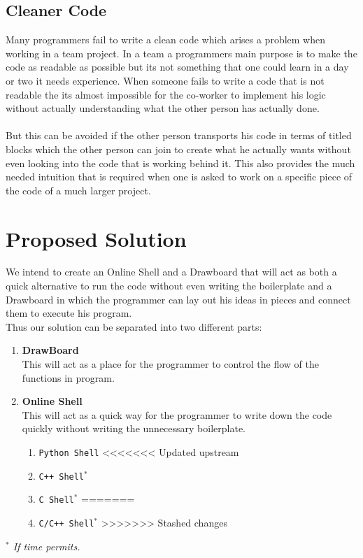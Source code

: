 \documentclass[letterpaper,10pt]{article}
\begin{document}
  		\subsection{Cleaner Code}
  		Many programmers fail to write a clean code which arises a problem when working in a team project. In a team a programmers main purpose is to make the code as readable as possible but its not something that one could learn in a day or two it needs experience. When someone fails to write a code that is not readable the its almost impossible for the co-worker to implement his logic without actually understanding what the other person has actually done.\\\\ But this can be avoided if the other person transports his code in terms of titled blocks which the other person can join to create what he actually wants without even looking into the code that is working behind it. This also provides the much needed intuition that is required when one is asked to work on a specific piece of the code of a much larger project.
  		\newpage
  		\section{Proposed Solution}
  		We intend to create an Online Shell and a Drawboard that will act as both a quick alternative to run the code without even writing the boilerplate and a Drawboard in which the programmer can lay out his ideas in pieces and connect them to execute his program.\\Thus our solution can be separated into two different parts:
  		\begin{enumerate}
  		\item \textbf{DrawBoard}\\ This will act as a place for the programmer to control the flow of the functions in program. 
  		\item \textbf{Online Shell}\\
  		This will act as a quick way for the programmer to write down the code quickly without writing the unnecessary boilerplate.
  		\begin{enumerate}
  		\item \texttt{Python Shell}
<<<<<<< Updated upstream
  		\item \texttt{C++ Shell$^{*}$}
  		\item \texttt{C Shell$^{*}$}
=======
  		\item \texttt{C/C++ Shell$^{*}$}
>>>>>>> Stashed changes
  		\end{enumerate}
  		\end{enumerate}
  		\begin{footnotesize}
  		
  		\begin{flushright}\textit{
  		$^{*}$ If time permits.}
  		\end{flushright}
  		\end{footnotesize}
\end{document}
